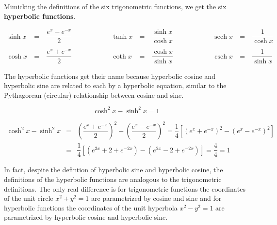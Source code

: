 \documentclass{book}
\DeclareMathOperator{\sech}{sech}
\DeclareMathOperator{\csch}{csch}
\begin{document}
Mimicking the definitions of the six trigonometric functions, we get the six \textbf{hyperbolic functions}.

\begin{Def}\mbox{}
\[\begin{alignedat}{100}
\sinh x\ &=\ & \dfrac{e^x-e^{-x}}{2}\ &\qquad\qquad& \tanh x\ &=\ & \dfrac{\sinh x}{\cosh x}\ &\qquad\qquad& \sech x\ &=\ & \dfrac{1}{\cosh x}\\\\
\cosh x\ &=\ & \dfrac{e^x+e^{-x}}{2}\ &\qquad\qquad& \coth x\ &=\ & \dfrac{\cosh x}{\sinh x}\ &\qquad\qquad& \csch x\ &=\ & \dfrac{1}{\sinh x}
\end{alignedat}\]
\end{Def}\vs

The hyperbolic functions get their name because hyperbolic cosine and hyperbolic sine are related to each by a hyperbolic equation, similar to the Pythagorean (circular) relationship between cosine and sine. 

\begin{Prop} \[\cosh^2 x - \sinh^2 x =1\]
\end{Prop}
\begin{pf}\mbox{}\vspace{-30pt}

\begin{eqnarray*}
\cosh^2 x  - \sinh^2 x &=& \left(\dfrac{e^x+e^{-x}}{2}\right)^2 - \left(\dfrac{e^x-e^{-x}}{2}\right)^2 = \dfrac{1}{4}[(e^x+e^{-x})^2 - (e^x-e^{-x})^2]\\
&=& \dfrac{1}{4}[(e^{2x}+2+e^{-2x}) - (e^{2x}-2+e^{-2x})] = \dfrac{4}{4} = 1
\end{eqnarray*}
\end{pf}\vs

In fact, despite the defintion of hyperbolic sine and hyperbolic cosine, the definitions of the hyperbolic functions are analogous to the trigonometric definitions. The only real difference is for trigonometric functions the coordinates of the unit circle $x^2+y^2=1$ are parametrized by cosine and sine and for hyperbolic functions the coordinates of the unit hyperbola $x^2-y^2=1$ are parametrized by hyperbolic cosine and hyperbolic sine. \vspace{-25pt}
\end{document}
